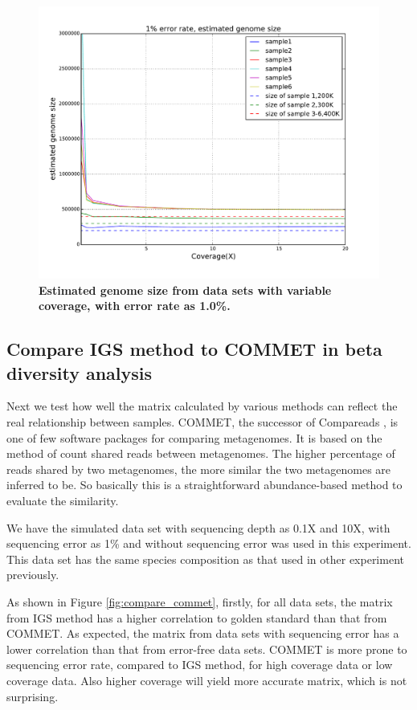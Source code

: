 \documentclass{article}
\begin{document}
\begin{figure}[!ht]
 \centerline{\includegraphics[width=6in]{./figures/alpha_by_coverage_001e.pdf}}
\caption{\bf Estimated genome size from data sets with variable coverage, with
error rate as 1.0\%. }
\label{fig:alpha_by_coverage_001e}
\end{figure}


\subsection{Compare IGS method to COMMET in beta diversity analysis}


Next we test how well the matrix calculated by various methods can reflect the
real relationship between samples. COMMET\cite{DBLP:conf/bibm/MailletCVLP14}, 
the successor of Compareads \cite{Maillet2012}, is one
of few software packages for comparing metagenomes. It is based on the method of
count shared reads between metagenomes. The higher percentage of reads
shared by two metagenomes, the more similar the two metagenomes are inferred to be. So
basically this is a straightforward abundance-based method to evaluate the
similarity.

We have the simulated data set with sequencing depth as 0.1X and 10X, with 
sequencing error as 1\% and without sequencing error was used in this experiment.
This data set has the same species composition as that used in other experiment previously.

As shown in Figure \ref{fig:compare_commet}, firstly, for 
all data sets, the matrix from IGS method has a higher 
correlation to golden standard than that from COMMET. As expected, 
the matrix from data sets with sequencing error has a lower correlation 
than that from error-free
data sets. COMMET is more prone to sequencing error rate, compared to 
IGS method, for high coverage data or low coverage data.
Also higher coverage will yield more accurate matrix, which is not surprising.
\end{document}
